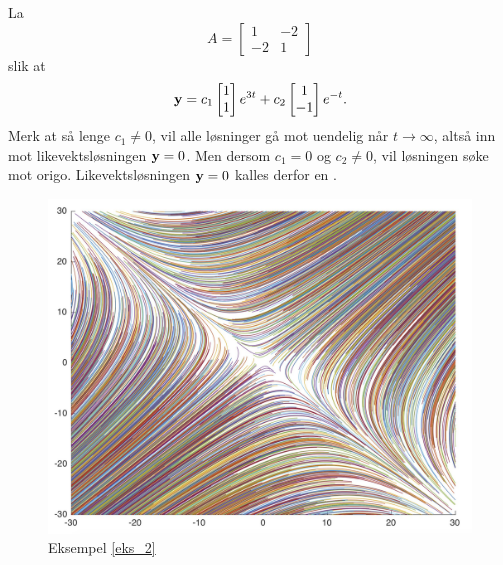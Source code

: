 \begin{ex}
\label{eks_2}
La 
\[
A=
\begin{bmatrix}
1 & -2   \\
-2 & 1
\end{bmatrix}
\]
slik at 
\[
\mathbf{y}=
c_1
\begin{bmatrix}
1  \\
1 
\end{bmatrix} e^{3t}
+
c_2
\begin{bmatrix}
1  \\
-1 
\end{bmatrix}e^{-t}. 
\]
Merk at så lenge $c_1 \neq 0$, 
vil alle løsninger gå mot uendelig når $t\to \infty$, altså inn mot likevektsløsningen $\mathbf{y}=0$. 
Men dersom $c_1=0$ og $c_2\neq0$, vil løsningen søke mot origo. Likevektsløsningen $\mathbf{y}=0$ kalles derfor en
.
\end{ex}


\begin{figure}[htbp]
  \begin{center}
	\includegraphics[scale=.1]{eks_2.jpg}	
	\captionsetup{labelformat=empty}
	\caption{Eksempel \ref{eks_2}}
	\end{center}
\end{figure}



